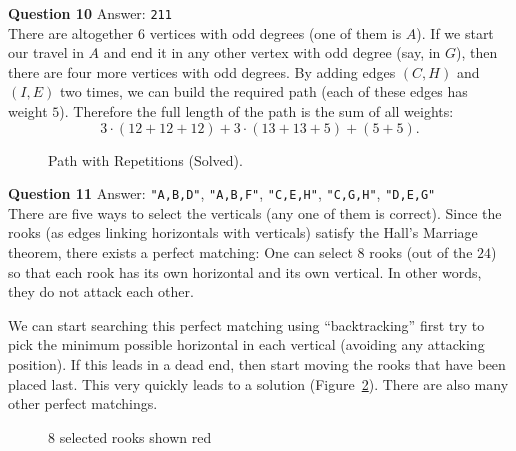 \documentclass[jou]{apa6}
\begin{document}
\vspace{10pt}
{\bf Question 10} Answer: {\tt 211}\\
There are altogether $6$ vertices with odd degrees (one of them is $A$). If we start our travel in $A$
and end it in any other vertex with odd degree (say, in $G$), then there are 
four more vertices with odd degrees. By adding edges $(C,H)$ and $(I,E)$ two times, we can 
build the required path (each of these edges has weight $5$). Therefore the full length of the 
path is the sum of all weights: 
$$3 \cdot (12 + 12 + 12) + 3 \cdot (13 + 13 + 5) + (5 + 5).$$

\begin{figure}[!htb]
\caption{\label{fig:path-with-repetitions2} Path with Repetitions (Solved).}
\end{figure}


\vspace{10pt}
{\bf Question 11} Answer: {\tt "A,B,D"}, {\tt "A,B,F"}, 
{\tt "C,E,H"}, {\tt "C,G,H"}, {\tt "D,E,G"}\\
There are five ways to select the verticals (any one of them is correct). 
Since the rooks (as edges linking horizontals with verticals) satisfy the Hall's Marriage theorem, 
there exists a perfect matching: One can select $8$ rooks (out of the $24$) so that
each rook has its own horizontal and its own vertical. In other words, they do not attack each other. 

We can start searching this perfect matching using ``backtracking'' \textendash{} first 
try to pick the minimum possible horizontal in each vertical (avoiding any attacking position). 
If this leads in a dead end, then start moving the rooks that have been placed last. 
This very quickly leads to a solution (Figure~\ref{fig:rooks2}). There are also many other 
perfect matchings.

\begin{figure}[!htb]
\caption{\label{fig:rooks2} 8 selected rooks shown red}
\end{figure}
\end{document}
